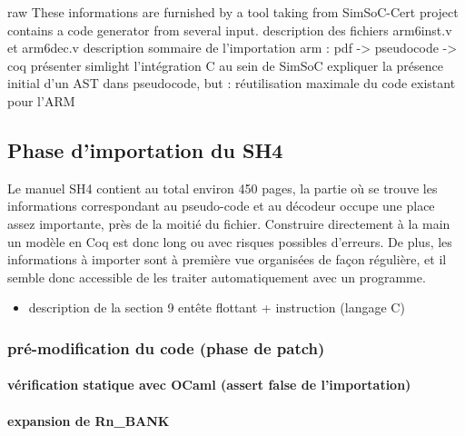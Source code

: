 \documentclass[a4paper, 11pt]{article}
\begin{document}
 raw   These informations are furnished by a tool taking from 
 SimSoC-Cert project contains a code generator from several input.
description des fichiers arm6inst.v et arm6dec.v
description sommaire de l'importation arm : pdf -> pseudocode -> coq
présenter simlight
l'intégration C au sein de SimSoC
expliquer la présence initial d'un AST dans pseudocode, but : réutilisation maximale du code existant pour l'ARM 


  \subsection{Phase d'importation du SH4}
Le manuel SH4 contient au total environ 450 pages, la partie où se trouve les informations correspondant au pseudo-code et au décodeur occupe une place assez importante, près de la moitié du fichier. Construire directement à la main un modèle en Coq est donc long ou avec risques possibles d'erreurs. De plus, les informations à importer sont à première vue organisées de façon régulière, et il semble donc accessible de les traiter automatiquement avec un programme.

    \begin{itemize}
    \item description de la section 9
 entête flottant + instruction (langage C)
    \end{itemize}


    \subsubsection{pré-modification du code (phase de patch)}
      \paragraph{vérification statique avec OCaml (assert false de l'importation)}
      \paragraph{expansion de Rn\_BANK}
\end{document}
